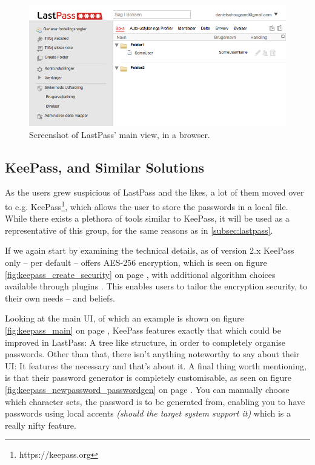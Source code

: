 			\begin{figure}[h!]
				\centering
				\includegraphics[width=\textwidth]{figures/analysis/lastpass_main.png}
				\caption{Screenshot of LastPass' main view, in a browser.}
				\label{fig:lastpass_main}
			\end{figure}

		\subsection*{KeePass, and Similar Solutions}
			As the users grew suspicious of LastPass and the likes, a lot of them moved over to e.g. KeePass\footnote{https://keepass.org}, which allows the user to store the passwords in a local file. While there exists a plethora of tools similar to KeePass,  it will be used as a representative of this group, for the same reasons as in \ref{subsec:lastpass}.

			If we again start by examining the technical details, as of version 2.x KeePass only -- per default -- offers AES-256 encryption, which is seen on figure \ref{fig:keepass_create_security} on page \pageref{fig:keepass_create_security}, with additional algorithm choices available through plugins \cite{keepass_security}. This enables users to tailor the encryption security, to their own needs -- and beliefs. 

			Looking at the main UI, of which an example is shown on figure \ref{fig:keepass_main} on page \pageref{fig:keepass_main}, KeePass features exactly that which could be improved in LastPass: A tree like structure, in order to completely organise passwords. Other than that, there isn't anything noteworthy to say about their UI: It features the necessary and that's about it. A final thing worth mentioning, is that their password generator is completely customisable, as seen on figure \ref{fig:keepass_newpassword_passwordgen} on page \pageref{fig:keepass_newpassword_passwordgen}. You can manually choose which character sets, the password is to be generated from, enabling you to have passwords using local accents \emph{(should the target system support it)} which is a really nifty feature.


